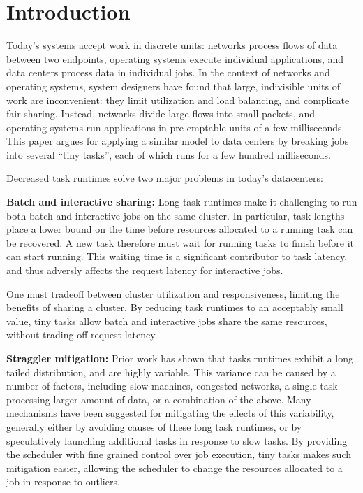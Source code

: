\section{Introduction}
Today's systems accept work in discrete units: networks process flows of data
between two endpoints, operating systems execute individual applications, and
data centers process data in individual jobs.  In the context of networks and
operating systems, system designers have found that large, indivisible units of work are
inconvenient: they limit utilization and load balancing,
and complicate fair sharing.  Instead, networks divide large flows into small
packets, and operating systems run applications in pre-emptable units of a
few milliseconds.  This paper argues for
applying a similar model to data centers by breaking jobs into
several ``tiny tasks'', each of which runs for a few hundred milliseconds.

Decreased task runtimes solve two major problems in today's datacenters:

\vspace{4pt}\noindent\textbf{Batch and interactive sharing:}
Long task runtimes make it challenging to run both batch and interactive
jobs on the same cluster. In particular, task lengths place a lower bound on
the time before resources allocated to a running task can be recovered. A new
task therefore must wait for running tasks to finish before it can start running.
This waiting time is a significant contributor to task latency, and thus adversly
affects the request latency for interactive jobs.

One must tradeoff between
cluster utilization and responsiveness, limiting the benefits of sharing
a cluster. By reducing task runtimes to an acceptably small value, tiny
tasks allow batch and interactive jobs share the same resources, without
trading off request latency.

\vspace{4pt}\noindent\textbf{Straggler mitigation:}
Prior work has shown that tasks runtimes exhibit a long
tailed distribution, and are highly variable. This variance can be caused by
a number of factors, including slow machines, congested networks, a single task
processing larger amount of data, or a combination of the above.
Many mechanisms have been suggested for mitigating
the effects of this variability, generally either by avoiding causes of these
long task runtimes, or by speculatively launching additional tasks in response to slow tasks.
By providing the scheduler with fine grained control over job execution, tiny
tasks makes such mitigation easier, allowing the scheduler to change the resources
allocated to a job in response to outliers.\\


